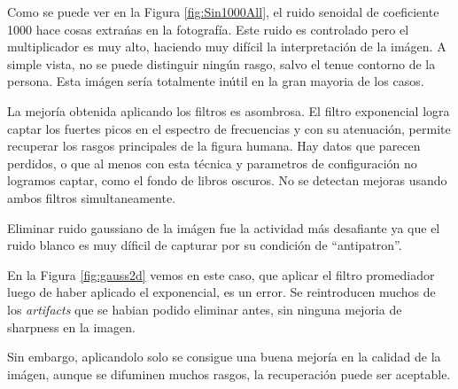 Como se puede ver en la Figura \ref{fig:Sin1000All}, el ruido senoidal
de coeficiente 1000 hace cosas extra\'nas en la fotograf\'ia.
Este ruido es controlado pero el multiplicador es muy alto, haciendo muy 
dif\'icil la interpretaci\'on de la im\'agen. A simple vista, no se puede distinguir ning\'un rasgo,
salvo el tenue contorno de la persona.
Esta im\'agen ser\'ia totalmente in\'util en la gran mayoria de los casos.

La mejor\'ia obtenida aplicando los filtros es asombrosa.
El filtro exponencial logra captar los fuertes picos en el espectro de
frecuencias y con su atenuaci\'on, permite recuperar los rasgos principales
de la figura humana.
Hay datos que parecen perdidos, o que al menos con esta t\'ecnica y
parametros de configuraci\'on no logramos captar, como el fondo de
libros oscuros. No se detectan mejoras usando ambos filtros simultaneamente.

Eliminar ruido gaussiano de la im\'agen fue la actividad m\'as desafiante
ya que el ruido blanco es muy d\'ificil de capturar por su condici\'on de ``antipatron''.

En la Figura \ref{fig:gauss2d} vemos en este caso, que aplicar el filtro
promediador luego de haber aplicado el exponencial, es un error. 
Se reintroducen muchos de los \textit{artifacts} que se habian podido
eliminar antes, sin ninguna mejoria de sharpness en la imagen. 

Sin embargo, aplicandolo solo se consigue una buena mejor\'ia en la calidad
de la im\'agen, aunque se difuminen muchos rasgos, la recuperaci\'on puede ser aceptable.
